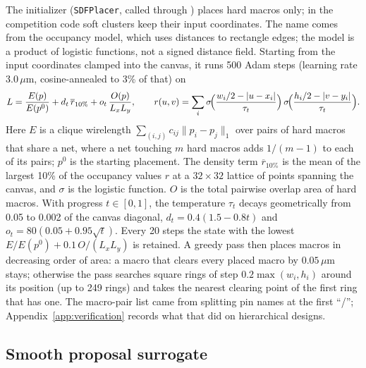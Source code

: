 The initializer (\texttt{SDFPlacer}, called through ) places hard
macros only; in the competition code soft clusters keep their input coordinates. The
name comes from the occupancy model, which uses distances to rectangle edges; the
model is a product of logistic functions, not a signed distance field. Starting from
the input coordinates clamped into the canvas, it runs 500 Adam steps (learning rate
$3.0\,\mu$m, cosine-annealed to 3\% of that) on
\begin{equation}
  L=\frac{E(p)}{E(p^0)}+d_t\,\overline{r}_{10\%}+o_t\,\frac{O(p)}{L_xL_y},
  \qquad
  r(u,v)=\sum_i\sigma\!\Bigl(\frac{w_i/2-|u-x_i|}{\tau_t}\Bigr)\,
              \sigma\!\Bigl(\frac{h_i/2-|v-y_i|}{\tau_t}\Bigr).
\end{equation}
Here $E$ is a clique wirelength $\sum_{(i,j)}c_{ij}\lVert p_i-p_j\rVert_1$ over pairs of
hard macros that share a net, where a net touching $m$ hard macros adds $1/(m-1)$
to each of its pairs; $p^0$ is the starting placement. The density term
$\overline{r}_{10\%}$ is the mean of the largest 10\% of the occupancy values $r$ at a
$32\times32$ lattice of points spanning the canvas, and $\sigma$ is the logistic
function. $O$ is the total pairwise overlap area of hard macros. With progress
$t\in[0,1]$, the temperature $\tau_t$ decays geometrically from 0.05 to 0.002 of the
canvas diagonal, $d_t=0.4(1.5-0.8t)$ and $o_t=80(0.05+0.95\sqrt t)$. Every 20 steps
the state with the lowest $E/E(p^0)+0.1\,O/(L_xL_y)$ is retained. A greedy pass then
places macros in decreasing order of area: a macro that clears every placed macro
by $0.05\,\mu$m stays; otherwise the pass searches square rings of step
$0.2\max(w_i,h_i)$ around its position (up to 249 rings) and takes the nearest
clearing point of the first ring that has one. The macro-pair list came from
splitting pin names at the first ``/''; Appendix~\ref{app:verification} records
what that did on hierarchical designs.

\subsection{Smooth proposal surrogate}\label{app:alg-surrogate}

